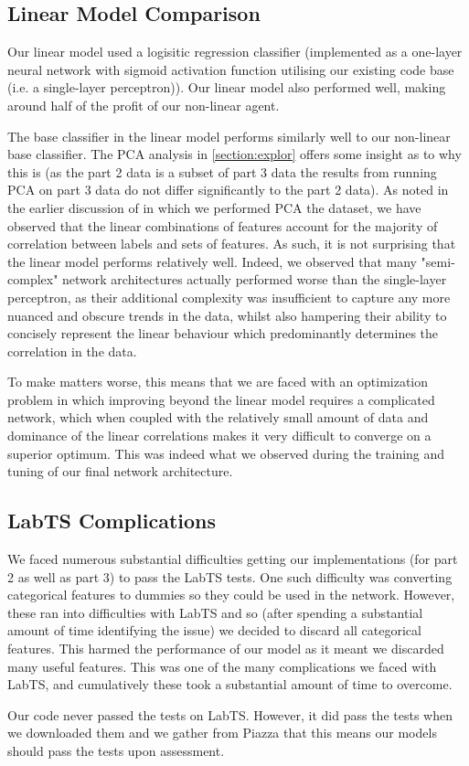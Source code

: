 \subsection{Linear Model Comparison}
\label{sec:linmodel}
Our linear model used a logisitic regression classifier (implemented as a one-layer neural network with sigmoid activation function utilising our existing code base (i.e. a single-layer perceptron)). Our linear model also performed well, making around half of the profit of our non-linear agent. 

The base classifier in the linear model performs similarly well to our non-linear base classifier. The PCA analysis in \autoref{section:explor} offers some insight as to why this is (as the part 2 data is a subset of part 3 data the results from running PCA on part 3 data do not differ significantly to the part 2 data). As noted in the earlier discussion of  in which we performed PCA the dataset, we have observed that the linear combinations of features account for the majority of correlation between labels and sets of features. As such, it is not surprising that the linear model performs relatively well. Indeed, we observed that many "semi-complex" network architectures actually performed worse than the single-layer perceptron, as their additional complexity was insufficient to capture any more nuanced and obscure trends in the data, whilst also hampering their ability to concisely represent the linear behaviour which predominantly determines the correlation in the data. 

To make matters worse, this means that we are faced with an optimization problem in which improving beyond the linear model requires a complicated network, which when coupled with the relatively small amount of data and dominance of the linear correlations makes it very difficult to converge on a superior optimum. This was indeed what we observed during the training and tuning of our final network architecture.

\newpage

\subsection{LabTS Complications}
We faced numerous substantial difficulties getting our implementations (for part 2 as well as part 3) to pass the LabTS tests. One such difficulty was converting categorical features to dummies so they could be used in the network. However, these ran into difficulties with LabTS and so (after spending a substantial amount of time identifying the issue) we decided to discard all categorical features. This harmed the performance of our model as it meant we discarded many useful features. This was one of the many complications we faced with LabTS, and cumulatively these took a substantial amount of time to overcome.

Our code never passed the tests on LabTS. However, it did pass the tests when we downloaded them and we gather from Piazza that this means our models should pass the tests upon assessment.

